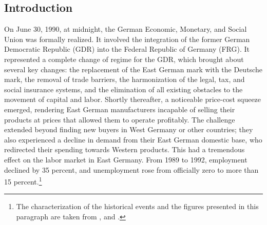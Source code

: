 \begin{Article}
\begin{refsection}[Spitz]

    
\section{Introduction}
On June 30, 1990, at midnight, the German Economic, Monetary, and Social Union was formally realized. It involved the integration of the former German Democratic Republic (GDR) into the Federal Republic of Germany (FRG). It represented a complete change of regime for the GDR, which brought about several key changes: the replacement of the East German mark with the Deutsche mark, the removal of trade barriers, the harmonization of the legal, tax, and social insurance systems, and the elimination of all existing obstacles to the movement of capital and labor. Shortly thereafter, a noticeable price-cost squeeze emerged, rendering East German manufacturers incapable of selling their products at prices that allowed them to operate profitably. The challenge extended beyond finding new buyers in West Germany or other countries; they also experienced a decline in demand from their East German domestic base, who redirected their spending towards Western products. This had a tremendous effect on the labor market in East Germany. From 1989 to 1992, employment declined by 35 percent, and unemployment rose from officially zero to more than 15 percent.\footnote{The characterization of the historical events and the figures presented in this paragraph are taken from \textcite{AkerlofRoseYellenHessenius1991}, and \textcite{BurdaHunt2001}.}


\end{refsection}
\end{Article}
